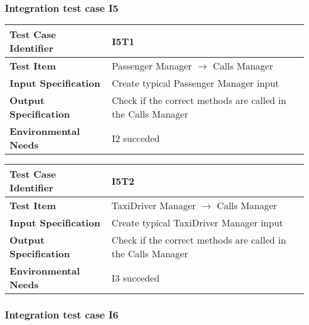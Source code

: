 \subsubsection{Integration test case I5}

\begin{table}[!htbp]
\begin{center}
\begin{tabular}[t]{p{}p{}}

\hline
\textbf{Test Case Identifier} & I5T1 \\
\hline
\textbf{Test Item} & Passenger Manager $\rightarrow$ Calls Manager \\
\hline
\textbf{Input Specification} & Create typical Passenger Manager input \\
\hline
\textbf{Output Specification} & Check if the correct methods are called in the Calls Manager \\
\hline
\textbf{Environmental Needs} & I2 succeded \\
\hline

\end{tabular}
\end{center}
\end{table}

\begin{table}[!htbp]
\begin{center}
\begin{tabular}[t]{p{}p{}}

\hline
\textbf{Test Case Identifier} & I5T2 \\
\hline
\textbf{Test Item} & TaxiDriver Manager $\rightarrow$ Calls Manager \\
\hline
\textbf{Input Specification} & Create typical TaxiDriver Manager input \\
\hline
\textbf{Output Specification} & Check if the correct methods are called in the Calls Manager \\
\hline
\textbf{Environmental Needs} & I3 succeded \\
\hline

\end{tabular}
\end{center}
\end{table}
\clearpage


\subsubsection{Integration test case I6}


